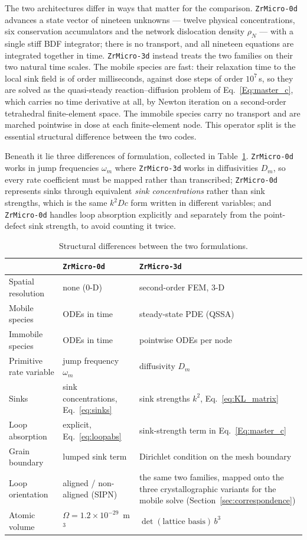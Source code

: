 \documentclass{article}
\newcommand{\ZrM}{\texttt{ZrMicro-3d}}
\newcommand{\ZrOd}{\texttt{ZrMicro-0d}}
\begin{document}
The two architectures differ in ways that matter for the comparison. {\ZrOd}
advances a state vector of nineteen unknowns --- twelve physical concentrations,
six conservation accumulators and the network dislocation density $\rho_N$ ---
with a single stiff BDF integrator; there is no transport, and all nineteen
equations are integrated together in time. {\ZrM} instead treats the two families
on their two natural time scales. The mobile species are fast: their relaxation
time to the local sink field is of order milliseconds, against dose steps of order
$10^{7}\,$s, so they are solved as the quasi-steady reaction--diffusion problem of
Eq.~\eqref{Eq:master_c}, which carries no time derivative at all, by Newton
iteration on a second-order tetrahedral finite-element space. The immobile species
carry no transport and are marched pointwise in dose at each finite-element node.
This operator split is the essential structural difference between the two codes.

Beneath it lie three differences of formulation, collected in
Table~\ref{tab:structure}. {\ZrOd} works in jump frequencies $\omega_m$ where
{\ZrM} works in diffusivities $D_m$, so every rate coefficient must be mapped
rather than transcribed; {\ZrOd} represents sinks through equivalent \emph{sink
concentrations} rather than sink strengths, which is the same $k^2Dc$ form written
in different variables; and {\ZrOd} handles loop absorption explicitly and
separately from the point-defect sink strength, to avoid counting it twice.

\begin{table}[htbp]
\centering
\caption{Structural differences between the two formulations.}
\label{tab:structure}
\small
\begin{tabular}{@{}p{}p{}p{}@{}}
\toprule
& \ZrOd{} & \ZrM{} \\
\midrule
Spatial resolution & none (0-D) & second-order FEM, 3-D \\
Mobile species & ODEs in time & steady-state PDE (QSSA) \\
Immobile species & ODEs in time & pointwise ODEs per node \\
Primitive rate variable & jump frequency $\omega_m$ & diffusivity $D_m$ \\
Sinks & sink concentrations, Eq.~\eqref{eq:sinks} & sink strengths $k^2$, Eq.~\eqref{eq:KL_matrix} \\
Loop absorption & explicit, Eq.~\eqref{eq:loopabs} & sink-strength term in Eq.~\eqref{Eq:master_c} \\
Grain boundary & lumped sink term & Dirichlet condition on the mesh boundary \\
Loop orientation & aligned / non-aligned (SIPN) & the same two families, mapped onto the three crystallographic variants for the mobile solve (Section~\ref{sec:correspondence}) \\
Atomic volume & $\Omega = 1.2\times10^{-29}$~m$^3$ & $\det(\text{lattice basis})\,b^3$ \\
\bottomrule
\end{tabular}
\end{table}
\end{document}
